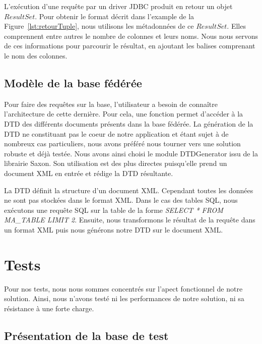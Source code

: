 \documentclass[a4paper,10pt]{article}
\newcommand{\fref}[1]{Figure~\ref{#1}}
\begin{document}
L'exécution d'une requête par un driver JDBC produit en retour un objet \(ResultSet\). Pour obtenir le format décrit dans l'example de la \fref{lst:retourTuple}, nous utilisons les métadonnées de ce \(ResultSet\). Elles comprennent entre autres le nombre de colonnes et leurs noms. Nous nous servons de ces informations pour parcourir le résultat, en ajoutant les balises comprenant le nom des colonnes.




\subsection{Modèle de la base fédérée}

Pour faire des requêtes sur la base, l'utilisateur a besoin de connaître l'architecture de cette dernière. 
Pour cela, une fonction permet d'accéder à la DTD des différents documents présents dans la base fédérée.
La génération de la DTD ne constituant pas le coeur de notre application et étant sujet à de nombreux cas particuliers, nous avons préféré nous tourner vers une solution robuste et déjà testée.
Nous avons ainsi choisi le module DTDGenerator issu de la librairie Saxon. 
Son utilisation est des plus directes puisqu'elle prend un document XML en entrée et rédige la DTD résultante.

La DTD définit la structure d'un document XML.
Cependant toutes les données ne sont pas stockées dans le format XML.
Dans le cas des tables SQL, nous exécutons une requête SQL sur la table de la forme \emph{SELECT * FROM MA\_TABLE LIMIT 2}.
Ensuite, nous transformons le résultat de la requête dans un format XML puis nous générons notre DTD sur le document XML.






\newpage
\section{Tests}

Pour nos tests, nous nous sommes concentrés sur l'apect fonctionnel de notre solution. Ainsi, nous n'avons testé ni les performances de notre solution, ni sa résistance à une forte charge.

\subsection{Présentation de la base de test}
\end{document}

